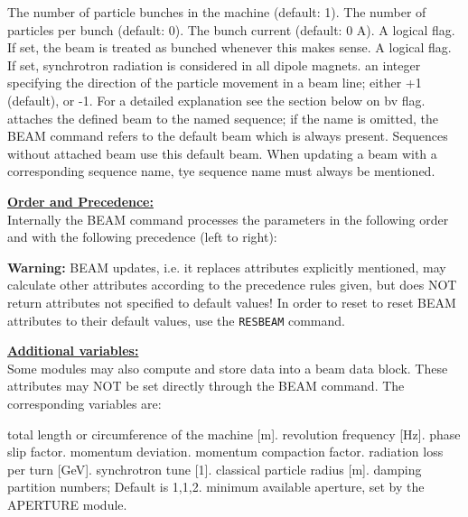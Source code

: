 \begin{madlist}
   The number of particle bunches in the
  machine (default: 1).  
   \label{beam_npart} The number of particles per bunch (default: 0). 
   The bunch current (default: 0 A). 
   A logical flag. If set, the beam is
  treated as bunched whenever this makes sense.  
   \label{beam_radiate} A logical flag. If set, synchrotron
  radiation is considered in all dipole magnets.  
   an integer specifying the direction of the
  particle movement in a beam line; either +1 (default), or -1. For a
  detailed explanation see the section below on bv flag.  
   attaches the defined beam to the named sequence; if
  the name is omitted, the BEAM command refers to the default beam
  which is always present. Sequences without attached beam use this
  default beam. When updating a beam with a corresponding sequence name,
  tye sequence name must always be mentioned.    
\end{madlist} 

\textbf{\underline{Order and Precedence:}}\\
Internally the BEAM command processes the parameters in the following
order and with the following precedence (left to right): 

\textbf{Warning:} BEAM updates, i.e. it replaces attributes explicitly
mentioned, may calculate other attributes according to the precedence rules
given, but does NOT return attributes not specified to default values! 
In order to reset to reset BEAM attributes to their default values, use
the \texttt{RESBEAM} command.


\textbf{\underline{Additional variables:}}\\ 
Some \mad modules may also compute and store data into a beam data 
block. These attributes may NOT be set directly through the BEAM
command. The corresponding variables are:  
\begin{madlist}
   total length or circumference of the machine [m].
   revolution frequency [Hz].
   phase slip factor.
   momentum deviation.
   momentum compaction factor.
   radiation loss per turn [GeV].
   synchrotron tune [1].
   classical particle radius [m].
   damping partition numbers; Default is {1,1,2}.
   minimum available aperture, set by the APERTURE module.
\end{madlist}

